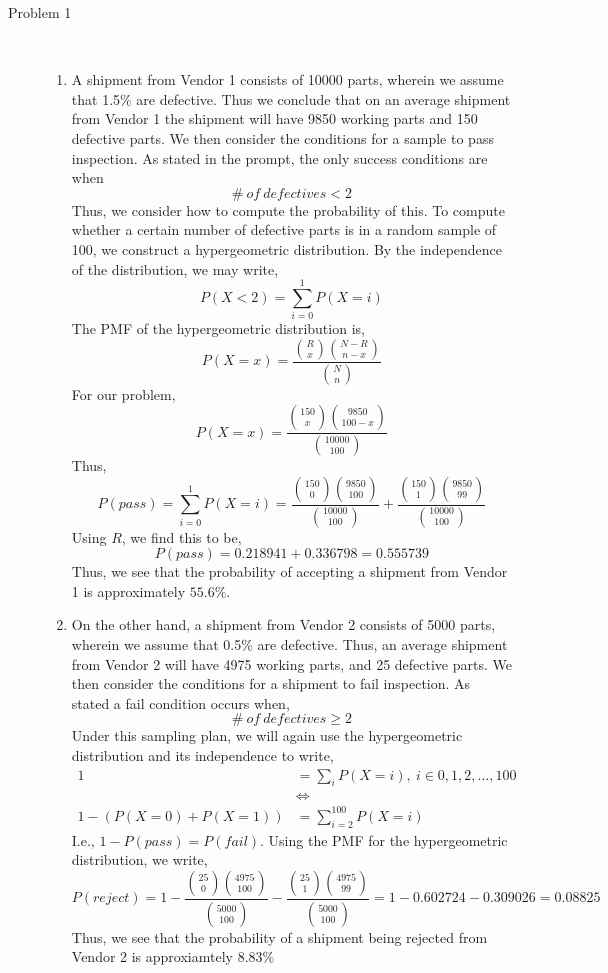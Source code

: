\documentclass[letterpaper,10pt]{article}
\begin{document}
\begin{description}
\item[Problem 1] \hfill \\
\begin{enumerate}
\item A shipment from Vendor 1 consists of 10000 parts, wherein we assume that 1.5\% are defective. Thus we conclude that on an average shipment from Vendor 1 the shipment will have 9850 working parts and 150 defective parts. We then consider the conditions for a sample to pass inspection. As stated in the prompt, the only success conditions are when
\[\#\ of\ defectives < 2\]
Thus, we consider how to compute the probability of this. To compute whether a certain number of defective parts is in a random sample of 100, we construct a hypergeometric distribution. By the independence of the distribution, we may write,
\[P(X<2)=\sum_{i=0}^1P(X=i)\]
The PMF of the hypergeometric distribution is,
\[P(X=x)=\frac{\binom{R}{x}\binom{N-R}{n-x}}{\binom{N}{n}}\]
For our problem,
\[P(X=x)=\frac{\binom{150}{x}\binom{9850}{100-x}}{\binom{10000}{100}}\]
Thus,
\[P(pass)=\sum_{i=0}^1P(X=i)=\frac{\binom{150}{0}\binom{9850}{100}}{\binom{10000}{100}}+\frac{\binom{150}{1}\binom{9850}{99}}{\binom{10000}{100}}\]
Using $R$, we find this to be,
\[P(pass)=0.218941+0.336798=0.555739\]
Thus, we see that the probability of accepting a shipment from Vendor 1 is approximately $55.6\%$.
\item On the other hand, a shipment from Vendor 2 consists of 5000 parts, wherein we assume that 0.5\% are defective. Thus, an average shipment from Vendor 2 will have 4975 working parts, and 25 defective parts. We then consider the conditions for a shipment to fail inspection. As stated a fail condition occurs when,
\[\#\ of\ defectives \geq 2\]
Under this sampling plan, we will again use the hypergeometric distribution and its independence to write,
\begin{align*}
1 &= \sum_i P(X=i),\ i\in 0,1,2,\ldots,100\\
 & \Leftrightarrow\\
1-(P(X=0)+P(X=1)) &= \sum_{i=2}^{100}P(X=i)
\end{align*}
I.e., $1-P(pass)=P(fail)$. Using the PMF for the hypergeometric distribution, we write, 
\[P(reject)=1-\frac{\binom{25}{0}\binom{4975}{100}}{\binom{5000}{100}}-\frac{\binom{25}{1}\binom{4975}{99}}{\binom{5000}{100}}=1-0.602724-0.309026=0.08825\]
Thus, we see that the probability of a shipment being rejected from Vendor 2 is approxiamtely $8.83\%$
\end{enumerate}

\end{description}
\end{document}
